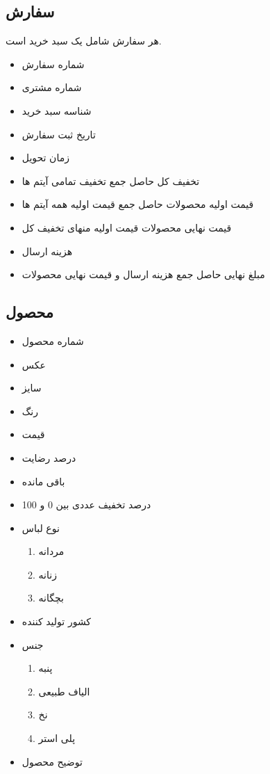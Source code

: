 \documentclass[]{article}
\begin{document}
\subsection{سفارش}
هر سفارش شامل یک سبد خرید است.
\begin{itemize}
\item شماره سفارش
\item شماره مشتری
\item شناسه سبد خرید
\item تاریخ ثبت سفارش
\item زمان تحویل
\item تخفیف کل
حاصل جمع تخفیف تمامی آیتم ها
\item قیمت اولیه محصولات
حاصل جمع قیمت اولیه همه آیتم ها
\item قیمت نهایی محصولات
قیمت اولیه منهای تخفیف کل
\item هزینه ارسال 
\item مبلغ نهایی \newline
حاصل جمع هزینه ارسال و قیمت نهایی محصولات
\end{itemize}









\subsection{محصول}
\begin{itemize}
\item شماره محصول
\item عکس
\item سایز
\item رنگ
\item قیمت
\item درصد رضایت
\item باقی مانده
\item درصد تخفیف \newline
عددی بین 0 و 100
\item  نوع لباس
\begin{enumerate}
\item مردانه
\item زنانه
\item بچگانه
\end{enumerate}
\item کشور تولید کننده
\item جنس
\begin{enumerate}
\item پنبه
\item الیاف طبیعی
\item نخ
\item پلی استر
\end{enumerate}
\item توضیح محصول
\end{itemize}
\end{document}
